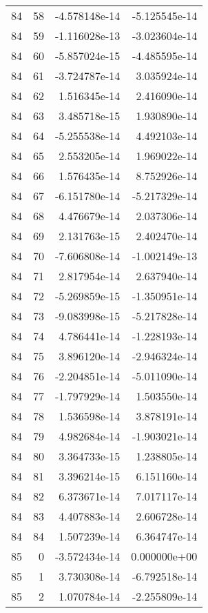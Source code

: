 \begin{tabular}{rrrr}
  84 &   58 & -4.578148e-14 & -5.125545e-14 \\
  84 &   59 & -1.116028e-13 & -3.023604e-14 \\
  84 &   60 & -5.857024e-15 & -4.485595e-14 \\
  84 &   61 & -3.724787e-14 &  3.035924e-14 \\
  84 &   62 &  1.516345e-14 &  2.416090e-14 \\
  84 &   63 &  3.485718e-15 &  1.930890e-14 \\
  84 &   64 & -5.255538e-14 &  4.492103e-14 \\
  84 &   65 &  2.553205e-14 &  1.969022e-14 \\
  84 &   66 &  1.576435e-14 &  8.752926e-14 \\
  84 &   67 & -6.151780e-14 & -5.217329e-14 \\
  84 &   68 &  4.476679e-14 &  2.037306e-14 \\
  84 &   69 &  2.131763e-15 &  2.402470e-14 \\
  84 &   70 & -7.606808e-14 & -1.002149e-13 \\
  84 &   71 &  2.817954e-14 &  2.637940e-14 \\
  84 &   72 & -5.269859e-15 & -1.350951e-14 \\
  84 &   73 & -9.083998e-15 & -5.217828e-14 \\
  84 &   74 &  4.786441e-14 & -1.228193e-14 \\
  84 &   75 &  3.896120e-14 & -2.946324e-14 \\
  84 &   76 & -2.204851e-14 & -5.011090e-14 \\
  84 &   77 & -1.797929e-14 &  1.503550e-14 \\
  84 &   78 &  1.536598e-14 &  3.878191e-14 \\
  84 &   79 &  4.982684e-14 & -1.903021e-14 \\
  84 &   80 &  3.364733e-15 &  1.238805e-14 \\
  84 &   81 &  3.396214e-15 &  6.151160e-14 \\
  84 &   82 &  6.373671e-14 &  7.017117e-14 \\
  84 &   83 &  4.407883e-14 &  2.606728e-14 \\
  84 &   84 &  1.507239e-14 &  6.364747e-14 \\
  85 &    0 & -3.572434e-14 &  0.000000e+00 \\
  85 &    1 &  3.730308e-14 & -6.792518e-14 \\
  85 &    2 &  1.070784e-14 & -2.255809e-14 \\

\end{tabular}
